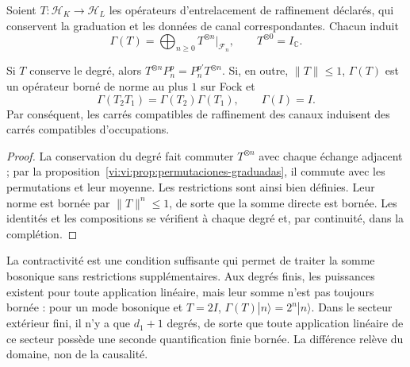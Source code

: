 Soient \(T:\mathcal H_K\to\mathcal H_L\) les opérateurs d’entrelacement
de raffinement déclarés, qui conservent la graduation et les
données de canal correspondantes. Chacun induit
\begin{equation}
 \Gamma(T)=\bigoplus_{n\ge0}T^{\otimes n}|_{\mathcal F_n},
 \qquad T^{\otimes0}=I_{\mathbb C}.
 \label{vi:vi:eq:segunda-cuantizacion-transporte}
\end{equation}

\begin{theorem}
\label{vi:vi:thm:fock-naturalidad}
Si \(T\) conserve le degré, alors
\(T^{\otimes n}P_n^p=P_n^{p'}T^{\otimes n}\).
Si, en outre, \(\|T\|\le1\), \(\Gamma(T)\) est un opérateur
borné de norme au plus \(1\) sur Fock et
\[
 \Gamma(T_2T_1)=\Gamma(T_2)\Gamma(T_1),\qquad
 \Gamma(I)=I.
\]
Par conséquent, les carrés compatibles de raffinement
des canaux induisent des carrés compatibles d’occupations.
\end{theorem}
\begin{proof}
La conservation du degré fait commuter \(T^{\otimes n}\)
avec chaque échange adjacent ; par la
proposition~\ref{vi:vi:prop:permutaciones-graduadas}, il commute
avec les permutations et leur moyenne. Les restrictions
sont ainsi bien définies. Leur norme est bornée par
\(\|T\|^n\le1\), de sorte que la somme directe est bornée.
Les identités et les compositions se vérifient à chaque degré
et, par continuité, dans la complétion.
\end{proof}

La contractivité est une condition suffisante qui permet de traiter
la somme bosonique sans restrictions supplémentaires. Aux degrés finis,
les puissances existent pour toute application linéaire, mais leur
somme n’est pas toujours bornée : pour un mode bosonique et \(T=2I\),
\(\Gamma(T)|n\rangle=2^n|n\rangle\). Dans le secteur extérieur
fini, il n’y a que \(d_1+1\) degrés, de sorte que toute
application linéaire de ce secteur possède une seconde quantification
finie bornée. La différence relève du domaine, non de la causalité.

